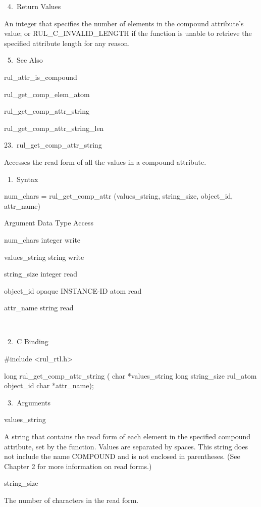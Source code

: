        4. Return Values

          An integer that specifies the number
          of elements in the compound
          attribute's value; or
          RUL_C_INVALID_LENGTH if the function
          is unable to retrieve the specified
          attribute length for any reason.

       5. See Also

    rul_attr_is_compound

    rul_get_comp_elem_atom

    rul_get_comp_attr_string

    rul_get_comp_attr_string_len

23. rul_get_comp_attr_string

    Accesses the read form of all the values
    in a compound attribute.

       1. Syntax

          num_chars = rul_get_comp_attr
          (values_string, string_size,
          object_id, attr_name)

          Argument  Data Type     Access

          num_chars  integer     write

          values_string  string     write

          string_size  integer     read

          object_id  opaque INSTANCE-ID atom
           read

          attr_name  string     read

           

       2. C Binding

          #include <rul_rtl.h>

          long rul_get_comp_attr_string (
          char *values_string
          long string_size
          rul_atom object_id
          char *attr_name);

       3. Arguments

          values_string

          A string that contains the read form
          of each element in the specified
          compound attribute, set by the
          function. Values are separated by
          spaces. This string does not include
          the name COMPOUND and is not
          enclosed in parentheses. (See
          Chapter 2 for more information on
          read forms.)

          string_size

          The number of characters in the read
          form.


